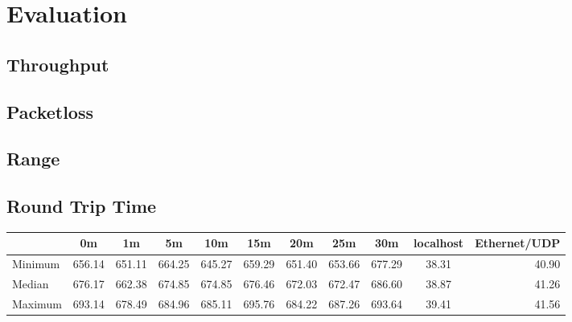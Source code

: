 \chapter{Evaluation}
\section{Throughput}
\section{Packetloss}
\section{Range}
\section{Round Trip Time}

\begin{tabular}{l*{9}{c}r}
        & 0m & 1m & 5m & 10m & 15m & 20m & 25m & 30m & localhost & Ethernet/UDP \\
\hline
Minimum & 656.14 & 651.11 & 664.25 & 645.27 & 659.29 & 651.40 & 653.66 & 677.29 & 38.31 & 40.90 \\
Median  & 676.17 & 662.38 & 674.85 & 674.85 & 676.46 & 672.03 & 672.47 & 686.60 & 38.87 & 41.26 \\
Maximum & 693.14 & 678.49 & 684.96 & 685.11 & 695.76 & 684.22 & 687.26 & 693.64 & 39.41 & 41.56 \\
\end{tabular}
